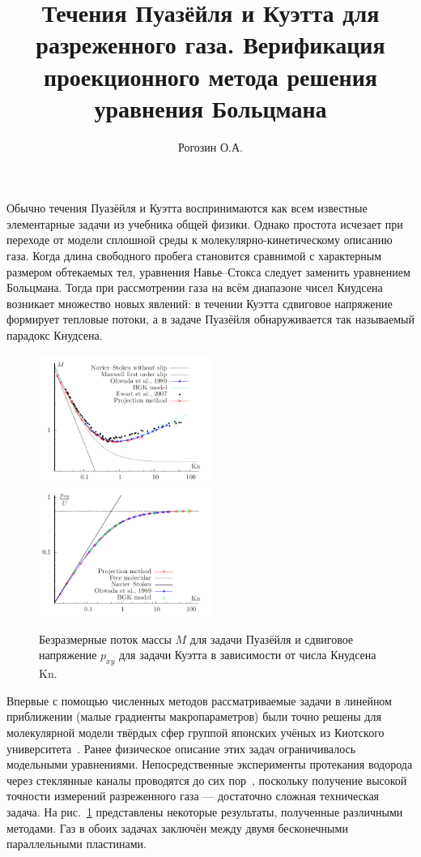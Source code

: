 \documentclass[a4paper,12pt]{article}
\begin{document}
\title{Течения Пуазёйля и Куэтта для разреженного газа. Верификация проекционного метода решения уравнения Больцмана}
\author{Рогозин О.А.}
\date{}
\maketitle

Обычно течения Пуазёйля и Куэтта воспринимаются как всем известные элементарные задачи из учебника общей физики.
Однако простота исчезает при переходе от модели сплошной среды к молекулярно-кинетическому описанию газа.
Когда длина свободного пробега становится сравнимой с характерным размером обтекаемых тел,
уравнения Навье--Стокса следует заменить уравнением Больцмана.
Тогда при рассмотрении газа на всём диапазоне чисел Кнудсена возникает множество новых явлений:
в течении Куэтта сдвиговое напряжение формирует тепловые потоки,
а в задаче Пуазёйля обнаруживается так называемый парадокс Кнудсена.

\begin{figure}[ht]
	\includegraphics[width=0.5\textwidth]{poiseuille}
	\includegraphics[width=0.5\textwidth]{couette}
	\caption{Безразмерные поток массы \(M\) для задачи Пуазёйля и сдвиговое напряжение \(p_{xy}\) 
		для задачи Куэтта в зависимости от числа Кнудсена \(\mathrm{Kn}\).}\label{fig}
\end{figure}

Впервые с помощью численных методов рассматриваемые задачи в линейном приближении (малые градиенты макропараметров)
были точно решены для молекулярной модели твёрдых сфер группой японских учёных из Киотского университета~\cite{Ohwada1989, Sone1990}.
Ранее физическое описание этих задач ограничивалось модельными уравнениями.
Непосредственные эксперименты протекания водорода через стеклянные каналы проводятся до сих пор~\cite{Ewart2007},
поскольку получение высокой точности измерений разреженного газа --- достаточно сложная техническая задача.
На рис.~\ref{fig} представлены некоторые результаты, полученные различными методами.
Газ в обоих задачах заключён между двумя бесконечными параллельными пластинами.  
\end{document}
